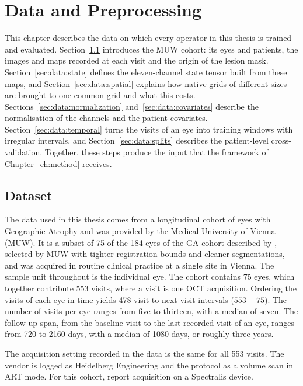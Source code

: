 \cleardoubleoddpage%
\chapter{Data and Preprocessing}
\label{ch:data}

This chapter describes the data on which every operator in this thesis is
trained and evaluated. Section~\ref{sec:data:dataset} introduces the MUW
cohort: its eyes and patients, the images and maps recorded at each visit
and the origin of the lesion mask. Section~\ref{sec:data:state} defines the
eleven-channel state tensor built from these maps, and
Section~\ref{sec:data:spatial} explains how native grids of different
sizes are brought to one common grid and what this costs.
Sections~\ref{sec:data:normalization} and~\ref{sec:data:covariates}
describe the normalisation of the channels and the patient covariates.
Section~\ref{sec:data:temporal} turns the visits of an eye into training
windows with irregular intervals, and Section~\ref{sec:data:splits}
describes the patient-level cross-validation. Together, these steps
produce the input that the framework of Chapter~\ref{ch:method} receives.


\section{Dataset}
\label{sec:data:dataset}
\label{sec:background:ga-oct:muw}

The data used in this thesis comes from a longitudinal cohort of eyes with
Geographic Atrophy and was provided by the Medical University of Vienna
(MUW). It is a subset of 75 of the 184 eyes of the GA cohort described
by \citet{Mai2024}, selected by MUW with tighter registration bounds and
cleaner segmentations, and was acquired in
routine clinical practice at a single site in Vienna. The sample unit throughout is the individual eye. The cohort
contains 75 eyes, which together contribute 553 visits, where a visit is
one OCT acquisition. Ordering the visits of each eye in time yields 478
visit-to-next-visit intervals ($553 - 75$). The number of visits per eye
ranges from five to thirteen, with a median of seven. The follow-up
span, from the baseline visit to the last recorded visit of an eye,
ranges from 720 to 2160 days, with a median of 1080 days, or roughly
three years.

The acquisition setting recorded in the data is the same for all 553
visits. The vendor is logged as Heidelberg Engineering and the protocol
as a volume scan in ART mode.
For this cohort, \citet{Mai2024} report acquisition on a Spectralis
device.

